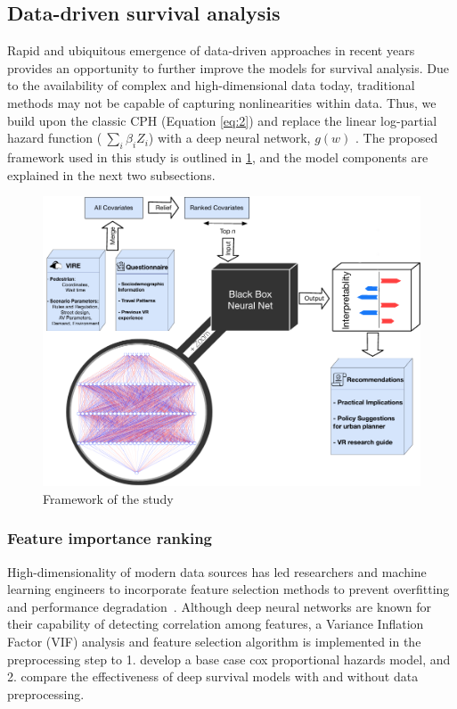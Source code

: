 \subsection{Data-driven survival analysis}
Rapid and ubiquitous emergence of data-driven approaches in recent years provides an opportunity to further improve the models for survival analysis. Due to the availability of complex and high-dimensional data today, traditional methods may not be capable of capturing nonlinearities within data. Thus, we build upon the classic CPH (Equation \ref{eq:2}) and replace the linear log-partial hazard function ($\ \sum_{i}\beta_i Z_i$) with a deep neural network, $g(w)$ \citep{kalatian2019deepwait}. The proposed framework used in this study is outlined in \cref{fig:framework}, and the model components are explained in the next two subsections.

\begin{figure}
    \centering
    \includegraphics[scale=0.85]{chapter_4/figures/framework.pdf}
    \caption{Framework of the study}
    \label{fig:framework}
\end{figure}

\subsubsection{Feature importance ranking}
High-dimensionality of modern data sources has led researchers and machine learning engineers to incorporate feature selection methods to prevent overfitting and performance degradation~\citep{alelyani2018feature}.  Although deep neural networks are known for their capability of detecting correlation among features, a Variance Inflation Factor (VIF) analysis and feature selection algorithm is implemented in the preprocessing step to 1. develop a base case cox proportional hazards model, and 2. compare the effectiveness of deep survival models with and without data preprocessing.   

